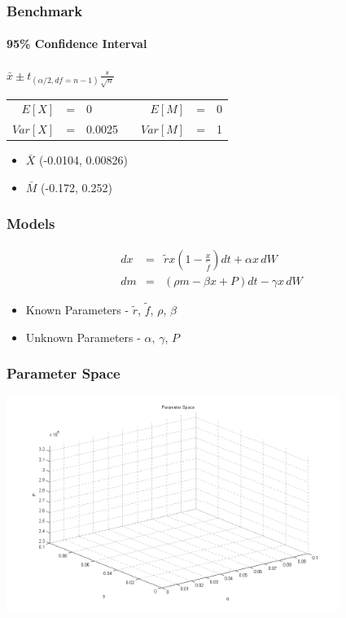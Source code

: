 \begin{frame}
    \frametitle{Benchmark}
	\framesubtitle{95\% Confidence Interval}
\begin{center}
	$\bar{x} \pm t_{(\alpha /2, df=n-1)} \frac{s}{\sqrt{n}}$ \\ 
\vspace{5mm}
\begin{tabular}{r c l c r c l}
	$E[X]$ &=& 0 && $E[M]$ &=& 0 \\
	$Var[X]$ &=& 0.0025  && $Var[M]$ &=& 1 
\end{tabular}
\end{center}
\begin{itemize}
	\item $\bar{X}$ (-0.0104, 0.00826)
	\item $\bar{M}$ (-0.172, 0.252)
\end{itemize}
\end{frame}


\begin{frame}
    \frametitle{Models}
	\begin{eqnarray*}
		dx &=& \tilde{r} x \left( 1- \frac{x}{\tilde{f}}\right) dt +\alpha x \, dW \\
		dm &=& ( \rho m - \beta x + P) dt - \gamma x \, dW
	\end{eqnarray*}
	\begin{itemize}
		\item Known Parameters - $\tilde{r}$, $\tilde{f}$, $\rho$, $\beta$
		\item Unknown Parameters - $\alpha$, $\gamma$, $P$
	\end{itemize}
\end{frame}


\begin{frame}
    \frametitle{Parameter Space}
\hspace*{-1cm}
\includegraphics[height=7cm]{parameterspace}
\end{frame}

